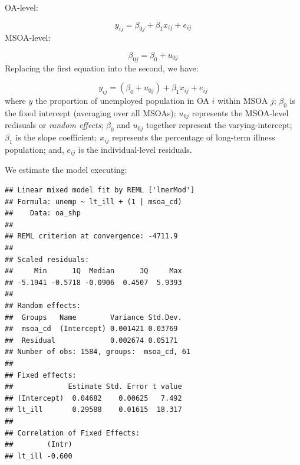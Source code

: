\documentclass[]{book}
\newenvironment{Shaded}{\begin{snugshade}}{\end{snugshade}}
\newcommand{\KeywordTok}[1]{\textcolor[rgb]{0.13,0.29,0.53}{\textbf{#1}}}
\newcommand{\DataTypeTok}[1]{\textcolor[rgb]{0.13,0.29,0.53}{#1}}
\newcommand{\DecValTok}[1]{\textcolor[rgb]{0.00,0.00,0.81}{#1}}
\newcommand{\StringTok}[1]{\textcolor[rgb]{0.31,0.60,0.02}{#1}}
\newcommand{\CommentTok}[1]{\textcolor[rgb]{0.56,0.35,0.01}{\textit{#1}}}
\newcommand{\OperatorTok}[1]{\textcolor[rgb]{0.81,0.36,0.00}{\textbf{#1}}}
\newcommand{\NormalTok}[1]{#1}
\begin{document}
OA-level:

\[y_{ij} = \beta_{0j} + \beta_{1}x_{ij} + e_{ij}\] MSOA-level:

\[\beta_{0j} = \beta_{0} + u_{0j}\] Replacing the first equation into
the second, we have:

\[y_{ij} = (\beta_{0} + u_{0j}) + \beta_{1}x_{ij} + e_{ij}\] where \(y\)
the proportion of unemployed population in OA \(i\) within MSOA \(j\);
\(\beta_{0}\) is the fixed intercept (averaging over all MSOAs);
\(u_{0j}\) represents the MSOA-level redisuals or \emph{random effects};
\(\beta_{0}\) and \(u_{0j}\) together represent the varying-intercept;
\(\beta_{1}\) is the slope coefficient; \(x_{ij}\) represents the
percentage of long-term illness population; and, \(e_{ij}\) is the
individual-level residuals.

We estimate the model executing:

\begin{Shaded}
\end{Shaded}

\begin{verbatim}
## Linear mixed model fit by REML ['lmerMod']
## Formula: unemp ~ lt_ill + (1 | msoa_cd)
##    Data: oa_shp
## 
## REML criterion at convergence: -4711.9
## 
## Scaled residuals: 
##     Min      1Q  Median      3Q     Max 
## -5.1941 -0.5718 -0.0906  0.4507  5.9393 
## 
## Random effects:
##  Groups   Name        Variance Std.Dev.
##  msoa_cd  (Intercept) 0.001421 0.03769 
##  Residual             0.002674 0.05171 
## Number of obs: 1584, groups:  msoa_cd, 61
## 
## Fixed effects:
##             Estimate Std. Error t value
## (Intercept)  0.04682    0.00625   7.492
## lt_ill       0.29588    0.01615  18.317
## 
## Correlation of Fixed Effects:
##        (Intr)
## lt_ill -0.600
\end{verbatim}
\end{document}
